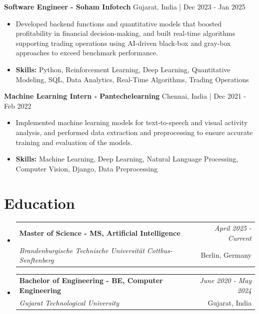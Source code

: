 \documentclass[a4paper,11pt]{article}
\makeatletter
\newcommand{\resumeSubheading}[4]{
\vspace{0.5mm}\item
    \begin{tabular*}{\linewidth}[t]{l@{\extracolsep{\fill}}r}
        \textbf{#1} & \textit{\footnotesize{#4}} \\
        \textit{\footnotesize{#3}} &  \footnotesize{#2}\\
    \end{tabular*}
    \vspace{-2.4mm}
}
\makeatother
\begin{document}
\vspace{1mm}
  \textbf{Software Engineer - Soham Infotech} \hfill Gujarat, India | Dec 2023 - Jan 2025
\vspace{-1.5mm} %
\begin{itemize}
  \item Developed backend functions and quantitative models that boosted profitability in financial decision-making, and built real-time algorithms supporting trading operations using AI-driven black-box and gray-box approaches to exceed benchmark performance.

\vspace{-2mm}
  \item \textbf{Skills:} Python, Reinforcement Learning, Deep Learning, Quantitative Modeling, SQL, Data Analytics, Real-Time Algorithms, Trading Operations
\end{itemize}

\vspace{1mm}
  \textbf{Machine Learning Intern - Pantechelearning} \hfill Chennai, India | Dec 2021 - Feb 2022
\vspace{-1.5mm} %
\begin{itemize}
  \item Implemented machine learning models for text-to-speech and visual activity analysis, and performed data extraction and preprocessing to ensure accurate training and evaluation of the models.
\vspace{-2mm}
  \item \textbf{Skills:} Machine Learning, Deep Learning, Natural Language Processing, Computer Vision, Django, Data Preprocessing
\end{itemize}\section{\textbf{Education}}
\vspace{-0.4mm}

\begin{itemize}[leftmargin=0.15in, label={}]
\resumeSubheading
{Master of Science - MS, Artificial Intelligence }{Berlin, Germany}
{Brandenburgische Technische Universität Cottbus-Senftenberg  }{April 2025 - Current}

\vspace{1.0mm} %
\resumeSubheading
{Bachelor of Engineering - BE, Computer Engineering  }{Gujarat, India}
{Gujarat Technological University }{June 2020 - May 2024}

\end{itemize}
\end{document}
